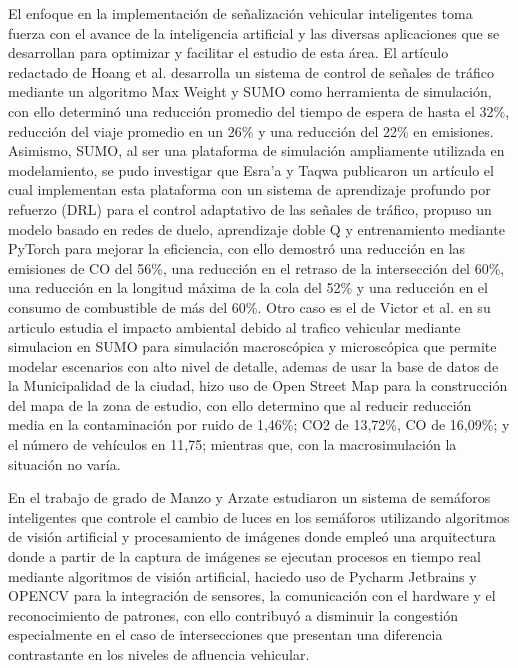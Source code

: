 \documentclass[conference]{IEEEtran}
\begin{document}
El enfoque en la implementación de señalización vehicular inteligentes toma fuerza con el avance de la inteligencia artificial y las diversas aplicaciones que se desarrollan para optimizar y facilitar el estudio de esta área. El artículo redactado de Hoang et al. \cite{Hoang2024} desarrolla un sistema de control de señales de tráfico mediante un algoritmo Max Weight y SUMO como herramienta de simulación, con ello determinó una reducción promedio del tiempo de espera de hasta el 32\%, reducción del viaje promedio en un 26\% y una reducción del 22\% en emisiones. Asimismo, SUMO, al ser una plataforma de simulación ampliamente utilizada en modelamiento, se pudo investigar que Esra’a y Taqwa \cite{Esra2024} publicaron un artículo el cual implementan esta plataforma con un sistema de aprendizaje profundo por refuerzo (DRL) para el control adaptativo de las señales de tráfico, propuso un modelo basado en redes de duelo, aprendizaje doble Q y entrenamiento mediante PyTorch para mejorar la eficiencia, con ello demostró una reducción en las emisiones de CO del 56\%, una reducción en el retraso de la intersección del 60\%, una reducción en la longitud máxima de la cola del 52\% y una reducción en el consumo de combustible de más del 60\%. Otro caso es el de Victor et al. \cite{Victor2019} en su articulo estudia el impacto ambiental debido al trafico vehicular mediante simulacion en SUMO para simulación macroscópica y microscópica que permite modelar escenarios con alto nivel de detalle, ademas de usar la base de datos de la Municipalidad de la ciudad, hizo uso de Open Street Map para la construcción del mapa de la zona de estudio, con ello determino que al reducir reducción media en la contaminación por ruido de 1,46\%; CO2 de 13,72\%, CO de 16,09\%; y el número de vehículos en 11,75; mientras que, con la macrosimulación la situación no varía.

En el trabajo de grado de Manzo y Arzate \cite{Manzo2019} estudiaron un sistema de semáforos inteligentes que controle el cambio de luces en los
semáforos utilizando algoritmos de visión artificial y procesamiento de imágenes donde empleó una arquitectura donde a partir de la captura de
imágenes se ejecutan procesos en tiempo real mediante algoritmos de visión artificial, haciedo uso de Pycharm Jetbrains y OPENCV para la integración de sensores, la comunicación con el hardware y el reconocimiento de patrones, con ello contribuyó a disminuir la congestión especialmente en el caso de intersecciones que presentan una diferencia contrastante en los niveles de afluencia vehicular. 
\end{document}
